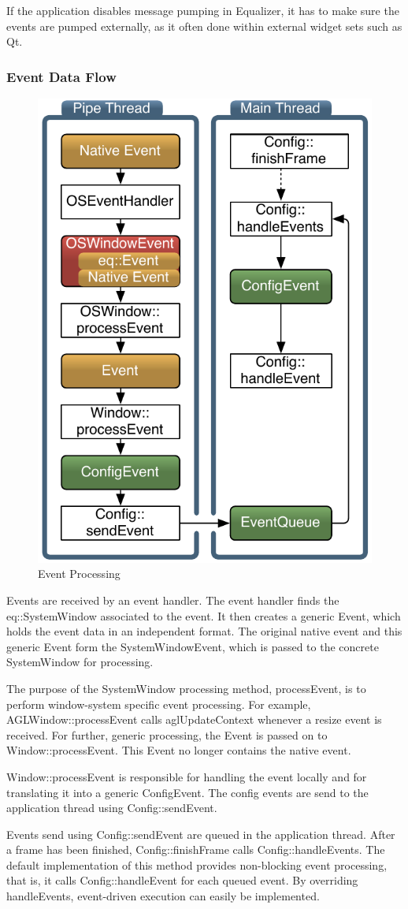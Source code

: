 \documentclass[10pt,a4]{scrartcl}
\begin{document}
If the application disables message pumping in Equalizer, it has to make
sure the events are pumped externally, as it often done within external
widget sets such as Qt.

\subsubsection{Event Data Flow}

\begin{figure}
  \vspace{-2ex}\includegraphics[width=.382\textwidth]{images/eventFilter.pdf}
  {\caption{\label{fEventProcessing}Event Processing}}
\end{figure}
Events are received by an event handler. The event handler finds the
\textsf{eq::Sys\-tem\-Win\-dow} associated to the event. It then creates a
generic \textsf{Event}, which holds the event data in an independent format. The
original native event and this generic \textsf{Event} form the
\textsf{SystemWindowEvent}, which is passed to the concrete
\textsf{SystemWindow} for processing.

The purpose of the \textsf{SystemWindow} processing method,
\textsf{processEvent}, is to perform window-system specific event
processing. For example, \textsf{AGLWindow::processEvent} calls
\textsf{aglUpdateContext} whenever a resize event is received. For
further, generic processing, the \textsf{Event} is passed on to
\textsf{Window::processEvent}. This \textsf{Event} no longer contains
the native event.

\textsf{Window::processEvent} is responsible for handling
the event locally and for translating it into a generic
\textsf{ConfigEvent}. The config events are send to the application
thread using \textsf{Config::sendEvent}. 

Events send using \textsf{Config::sendEvent} are queued in the
application thread. After a frame has been finished,
\textsf{Config::finishFrame} calls \textsf{Config::handleEvents}. The
default implementation of this method provides non-blocking event
processing, that is, it calls \textsf{Config::handleEvent} for each
queued event. By overriding \textsf{handleEvents}, event-driven
execution can easily be implemented.
\end{document}

